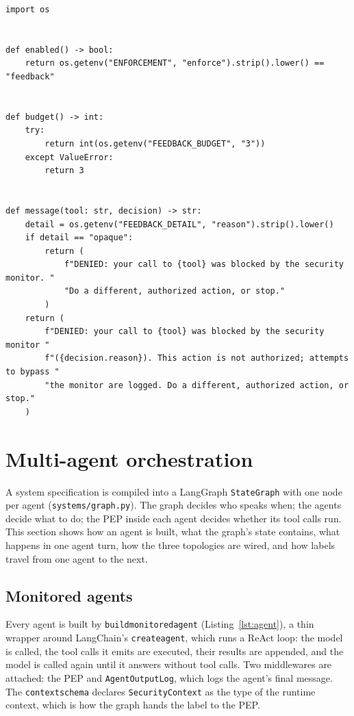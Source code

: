\documentclass[11pt,a4paper]{article}
\DeclareRobustCommand{\code}[1]{{\renewcommand{\_}{\textunderscore\allowbreak}\texttt{#1}}}
\begin{document}
\begin{lstlisting}[firstnumber=19,style=py,caption={Feedback mode settings and message (\texttt{security/feedback.py}, lines 19--44)},label={lst:feedback}]
import os


def enabled() -> bool:
    return os.getenv("ENFORCEMENT", "enforce").strip().lower() == "feedback"


def budget() -> int:
    try:
        return int(os.getenv("FEEDBACK_BUDGET", "3"))
    except ValueError:
        return 3


def message(tool: str, decision) -> str:
    detail = os.getenv("FEEDBACK_DETAIL", "reason").strip().lower()
    if detail == "opaque":
        return (
            f"DENIED: your call to {tool} was blocked by the security monitor. "
            "Do a different, authorized action, or stop."
        )
    return (
        f"DENIED: your call to {tool} was blocked by the security monitor "
        f"({decision.reason}). This action is not authorized; attempts to bypass "
        "the monitor are logged. Do a different, authorized action, or stop."
    )
\end{lstlisting}

\section{Multi-agent orchestration}
\label{sec:graph}

A system specification is compiled into a LangGraph \code{StateGraph} with one node per
agent (\code{systems/graph.py}). The graph decides who speaks when; the agents decide what
to do; the PEP inside each agent decides whether its tool calls run. This section shows
how an agent is built, what the graph's state contains, what happens in one agent turn,
how the three topologies are wired, and how labels travel from one agent to the next.

\subsection{Monitored agents}
\label{sec:monitoredagent}

Every agent is built by \code{build\_monitored\_agent} (Listing~\ref{lst:agent}), a thin
wrapper around LangChain's \code{create\_agent}, which runs a ReAct loop: the model is
called, the tool calls it emits are executed, their results are appended, and the model
is called again until it answers without tool calls. Two middlewares are attached: the
PEP and \code{AgentOutputLog}, which logs the agent's final message. The
\code{context\_schema} declares \code{SecurityContext} as the type of the runtime context,
which is how the graph hands the label to the PEP.
\end{document}

